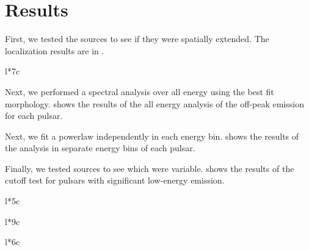 \section{Results}

First, we tested the sources to see if they
were spatially extended. The localization results are in .

\begin{deluxetable}{l*{7}c}
\tabletypesize{\scriptsize}

\end{deluxetable}


Next, we performed a spectral analysis over all energy using the best
fit morphology.  shows the results of the all energy
analysis of the off-peak emission for each pulsar.

Next, we fit a powerlaw independently in each energy
bin.  shows the results of the analysis in separate
energy bins of each pulsar.

Finally, we tested sources to see which were
variable.  shows the results of the cutoff test for
pulsars with significant low-energy emission.


\begin{deluxetable}{l*{5}c}
\tabletypesize{\scriptsize}

\end{deluxetable}

\clearpage
\begin{deluxetable}{l*{9}c}
\setlength{\tabcolsep}{0.04in}
\tabletypesize{\scriptsize}
\tablewidth{0pt}
\rotate
{}

\end{deluxetable}

\begin{deluxetable}{l*{6}c}
\tabletypesize{\scriptsize}

\end{deluxetable}




